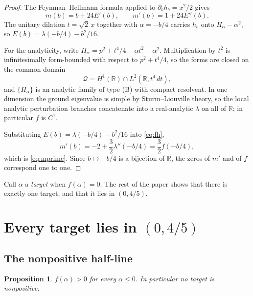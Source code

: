 \documentclass[11pt,reqno]{amsart}
\theoremstyle{plain}
\newtheorem{proposition}[theorem]{Proposition}
\theoremstyle{definition}
\theoremstyle{remark}
\numberwithin{equation}{section}
\begin{document}
\begin{proof}
  The Feynman--Hellmann formula applied to $\partial_bh_b=x^2/2$ gives
  \begin{equation}
    \label{eq:fh}
    m(b)=b+24E'(b),
    \qquad
    m'(b)=1+24E''(b).
  \end{equation}
  The unitary dilation $t=\sqrt2\,x$ together with $\alpha=-b/4$ carries
  $h_b$ onto $H_\alpha-\alpha^2$, so $E(b)=\lambda(-b/4)-b^2/16$.

  For the analyticity, write
  $H_\alpha=p^2+t^4/4-\alpha t^2+\alpha^2$. Multiplication by $t^2$ is
  infinitesimally form-bounded with respect to $p^2+t^4/4$, so the forms are
  closed on the common domain
  \begin{equation*}
    \mathcal Q=H^1(\mathbb R)\cap L^2(\mathbb R,t^4\,dt),
  \end{equation*}
  and $\{H_\alpha\}$ is an analytic family of type (B) with compact
  resolvent. In one dimension the ground eigenvalue is simple by
  Sturm--Liouville theory, so the local analytic perturbation branches
  concatenate into a real-analytic $\lambda$ on all of $\mathbb R$; in
  particular $f$ is $C^1$.

  Substituting $E(b)=\lambda(-b/4)-b^2/16$ into \eqref{eq:fh},
  \begin{equation*}
    m'(b)=-2+\frac32\lambda''(-b/4)=\frac32 f(-b/4),
  \end{equation*}
  which is \eqref{eq:mprime}. Since $b\mapsto-b/4$ is a bijection of
  $\mathbb R$, the zeros of $m'$ and of $f$ correspond one to one.
\end{proof}

Call $\alpha$ a \emph{target} when $f(\alpha)=0$. The rest of the paper
shows that there is exactly one target, and that it lies in $(0,4/5)$.

\section{Every target lies in \texorpdfstring{$(0,4/5)$}{(0,4/5)}}
\label{sec:localization}

\subsection{The nonpositive half-line}

\begin{proposition}
  \label{prop:nonpositive}
  $f(\alpha)>0$ for every $\alpha\le0$. In particular no target is
  nonpositive.
\end{proposition}
\end{document}
